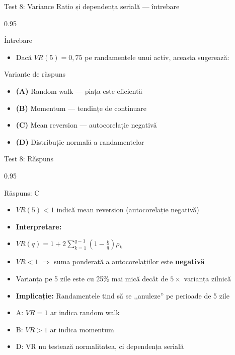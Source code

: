 \documentclass[9pt, aspectratio=169, t]{beamer}
\begin{document}
\begin{frame}[shrink=15]{Test 8: Variance Ratio și dependența serială --- întrebare}
\begin{cminipage}{0.95\textwidth}
\begin{alertblock}{Întrebare}
\begin{itemize}\setlength{\itemsep}{0pt}
    \item Dacă $VR(5) = 0{,}75$ pe randamentele unui activ, aceasta sugerează:
\end{itemize}
\end{alertblock}

\vspace{0.4cm}
\begin{block}{Variante de răspuns}
\begin{itemize}\setlength{\itemsep}{2pt}
    \item \textcolor{MainBlue}{\textbf{(A)}} Random walk --- piața este eficientă
    \item \textcolor{MainBlue}{\textbf{(B)}} Momentum --- tendințe de continuare
    \item \textcolor{MainBlue}{\textbf{(C)}} Mean reversion --- autocorelație negativă
    \item \textcolor{MainBlue}{\textbf{(D)}} Distribuție normală a randamentelor
\end{itemize}
\end{block}
\end{cminipage}
\end{frame}

\begin{frame}[shrink=15]{Test 8: Răspuns}
\begin{cminipage}{0.95\textwidth}
\begin{exampleblock}{Răspuns: C}
\begin{itemize}\setlength{\itemsep}{0pt}
    \item $VR(5) < 1$ indică mean reversion (autocorelație negativă)
\end{itemize}
\end{exampleblock}

\vspace{0.2cm}
\begin{itemize}\setlength{\itemsep}{0pt}
    \item \textbf{Interpretare:}
    \item $VR(q) = 1 + 2\sum_{k=1}^{q-1}\left(1 - \frac{k}{q}\right)\rho_k$
    \item $VR < 1$ $\Rightarrow$ suma ponderată a autocorelațiilor este \textbf{negativă}
    \item Varianța pe 5 zile este cu 25\% mai mică decât de $5\times$ varianța zilnică
    \item \textbf{Implicație:} Randamentele tind să se ,,anuleze'' pe perioade de 5 zile
    \item A: $VR = 1$ ar indica random walk \incorrect
    \item B: $VR > 1$ ar indica momentum \incorrect
    \item D: VR nu testează normalitatea, ci dependența serială \incorrect
\end{itemize}
\end{cminipage}
\end{frame}
\end{document}
